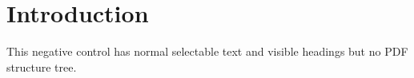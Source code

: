 \documentclass[11pt]{article}
\begin{document}
\section{Introduction}
This negative control has normal selectable text and visible headings but no PDF structure tree.
\end{document}
